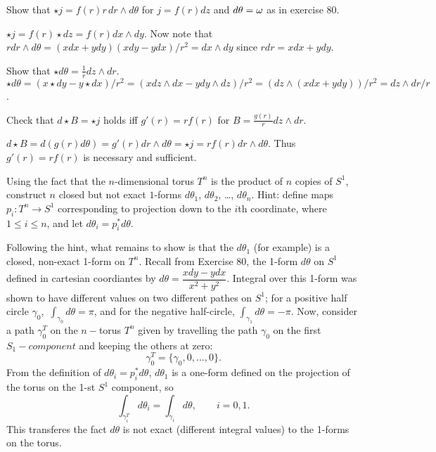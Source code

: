 \documentclass[a4paper,12pt]{report}
\numberwithin{equation}{section}
\begin{document}
\begin{p}%
{Show that $\star j=f(r)r\,dr\wedge d\theta$ for $j=f(r)dz$ and $d\theta=\omega$ as in exercise 80.}
\end{p}
{$\star j=f(r)\star dz=f(r)dx\wedge dy$. Now note that $r dr\wedge d\theta=(xdx+ydy)(xdy-ydx)/r^2=dx\wedge dy$ since $r dr=xdx+ydy$.}

\begin{p}%
{Show that $\star d\theta=\frac{1}{r}dz\wedge dr$.}{$\star d\theta=(x\star dy-y\star dx)/r^2=(xdz\wedge dx-ydy\wedge dz)/r^2=(dz\wedge(xdx+ydy))/r^2=dz\wedge dr/r$.}
\end{p}

\begin{p}%
{Check that $d\star B=\star j$ holds iff $g'(r)=rf(r)$ for $B=\frac{g(r)}{r} dz\wedge dr$.}
\end{p}
{$d\star B=d(g(r)d\theta)=g'(r)dr\wedge d\theta=\star j=rf(r)dr\wedge d\theta.$ Thus $g'(r)=rf(r)$ is necessary and sufficient.}

\begin{p}%
Using the fact that the $n$-dimensional torus $T^n$ is the product of $n$ copies of $S^1$, construct $n$ closed but not exact $1$-forms $d\theta_1$, $d\theta_2$, \dots, $d\theta_n$. Hint: define maps $p_i:T^n\to S^1$ corresponding to projection down to the $i$th coordinate, where $1\leq i\leq n$, and let $d\theta_i=p_i^*d\theta$.
\end{p}
{Following the hint, what remains to show is that the $d\theta_1$ (for example) is a closed, non-exact 1-form on $T^n$. Recall from Exercise 80, the 1-form $d\theta$ on $S^1$ defined in cartesian coordiantes by $d\theta = \dfrac{xdy-ydx}{x^2+y^2}$. Integral over this 1-form  was shown to have different values on two different pathes on $S^1$; for a positive half circle $\gamma_0$, $\,\int_{\gamma_0}d\theta = \pi$, and for the negative half-circle, $\int_{\gamma_1}d\theta = -\pi$.
Now, consider a path $\gamma_0^T$ on the $n-$torus $T^n$ given by travelling the path $\gamma_0$ on the first $S_1-component$ and keeping the others at zero:
$$
\gamma_0^T = \{\gamma_0, 0, ..., 0\}.
$$
From the definition of $d\theta_i=p_i^*d\theta$, $d\theta_1$ is a one-form defined on the projection of the torus on the 1-st $S^1$ component, so 
$$ 
\int_{\gamma_i^T}d\theta_i = \int_{\gamma_i}d\theta, \qquad i=0,1.
$$
}
This transferes the fact $d\theta$ is not exact (different integral values) to the 1-forms on the torus. 

\begin{p}
\end{p}


\begin{p}
\end{p}


\begin{p}
\end{p}


\begin{p}
\end{p}


\begin{p}
\end{p}


\begin{p}
\end{p}


\begin{p}
\end{p}


\begin{p}%
\end{p}
\end{document}
